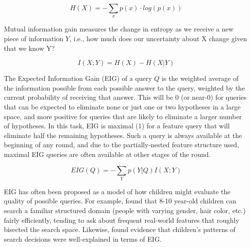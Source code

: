 \documentclass[10pt,letterpaper]{article}
\begin{document}
\begin{equation}
  H(X) = -\sum_{x} p(x) \cdot log(p(x))
\end{equation}

Mutual information gain measures the change in entropy as we receive a new piece 
of information $Y$, i.e., how much does our uncertainty about X change given that 
we know Y?

\begin{equation}
  I(X;Y) = H(X) - H(X|Y)
\end{equation}

The Expected Information Gain (EIG) of a query $Q$ is the weighted average of the 
information possible from each possible answer to the query, weighted by the 
current probability of receiving that answer. This will be 0 (or near-0) for queries that 
can be expected to eliminate none or just one or two hypotheses in a large space, 
and more positive for queries that are likely to eliminate a larger number of 
hypotheses. In this task, EIG is maximal (1) for a feature query that will eliminate 
half the remaining hypotheses. Such a query is always available at the beginning of 
any round, and due to the partially-nested feature structure used, maximal EIG 
queries are often available at other stages of the round.

\begin{equation}
  EIG(Q) = -\sum_{Y} p(Y|Q) I(X;Y)
\end{equation}

EIG has often been proposed as a model of how children might evaluate the quality of possible queries.  For example,  found that 8-10 year-old children can search a familiar structured domain (people with varying gender, hair color, etc.) fairly efficiently, tending to ask about frequent real-world features that roughly bisected the search space. 
 Likewise,  found evidence that children's patterns of search decisions were well-explained in terms of EIG.
\end{document}
